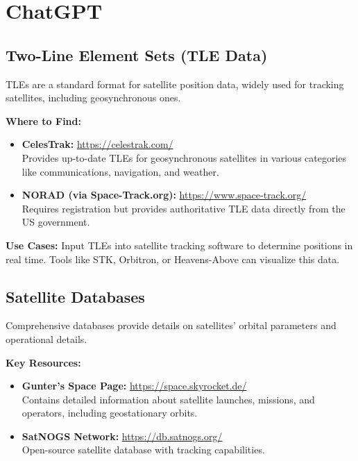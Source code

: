 % 

\section{ChatGPT}

\subsection{Two-Line Element Sets (TLE Data)}
TLEs are a standard format for satellite position data, widely used for tracking satellites, including geosynchronous ones.

\textbf{Where to Find:}
\begin{itemize}
    \item \textbf{CelesTrak:} \href{https://celestrak.com/}{https://celestrak.com/} \\
    Provides up-to-date TLEs for geosynchronous satellites in various categories like communications, navigation, and weather.
    \item \textbf{NORAD (via Space-Track.org):} \href{https://www.space-track.org/}{https://www.space-track.org/} \\
    Requires registration but provides authoritative TLE data directly from the US government.
\end{itemize}

\textbf{Use Cases:}
Input TLEs into satellite tracking software to determine positions in real time. Tools like STK, Orbitron, or Heavens-Above can visualize this data.

\subsection{Satellite Databases}
Comprehensive databases provide details on satellites' orbital parameters and operational details.

\textbf{Key Resources:}
\begin{itemize}
    \item \textbf{Gunter's Space Page:} \href{https://space.skyrocket.de/}{https://space.skyrocket.de/} \\
    Contains detailed information about satellite launches, missions, and operators, including geostationary orbits.
    \item \textbf{SatNOGS Network:} \href{https://db.satnogs.org/}{https://db.satnogs.org/} \\
    Open-source satellite database with tracking capabilities.
\end{itemize}

